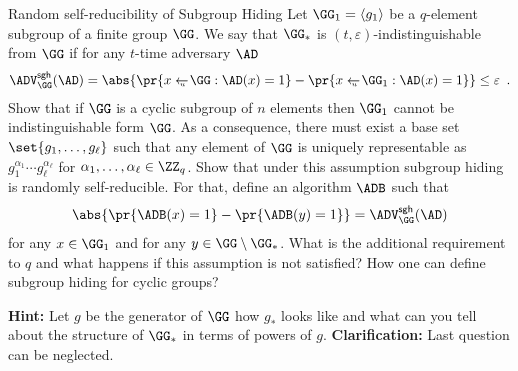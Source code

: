 \documentclass{crypto-exercise}
\author{Sven Laur}
\newcommand{\ADVSH}[2]{\ADV_{#1}^{\mathsf{sgh}}(#2)}
\begin{document}
\begin{exercise}{Random self-reducibility of Subgroup Hiding}
 Let $\GG_1=\langle g_1\rangle$ be a $q$-element subgroup of a finite group $\GG$. 
 We say that $\GG_*$ is $(t,\varepsilon)$-indistinguishable from $\GG$ if for any $t$-time
 adversary $\AD$
  \begin{align*}
  \ADVSH{\GG}{\AD}=\abs{\pr{x\getsu\GG:\AD(x)=1}-\pr{x\getsu\GG_1:\AD(x)=1}}
  \leq\varepsilon\enspace.
  \end{align*}
 Show that if $\GG$ is a cyclic subgroup of $n$ elements then $\GG_1$ cannot be 
 indistinguishable form $\GG$. As a consequence, there must exist a base set 
 $\set{g_1,\ldots,g_\ell}$ such that any element of $\GG$ is uniquely representable as
 $g_1^{\alpha_1}\cdots g_\ell^{\alpha_\ell}$ for $\alpha_1,\ldots,\alpha_\ell\in\ZZ_q$. 
 Show that under this assumption subgroup hiding is randomly self-reducible. For that,
 define an algorithm $\ADB$ such that 
 \begin{align*}
 \abs{\pr{\ADB(x)=1}-\pr{\ADB(y)=1}}=\ADVSH{\GG}{\AD}
 \end{align*} 
 for any $x\in\GG_1$ and for any $y\in\GG\setminus\GG_*$. What is the additional requirement to 
 $q$ and what happens if this assumption is not satisfied? How one can define subgroup hiding 
 for cyclic groups?  
\end{exercise}
\begin{solution}
\textbf{Hint:} Let $g$ be the generator of $\GG$ how $g_*$ looks like and what can you tell about 
the structure of $\GG_*$ in terms of powers of $g$.
\textbf{Clarification:} Last question can be neglected.
	
\end{solution}
\end{document}
